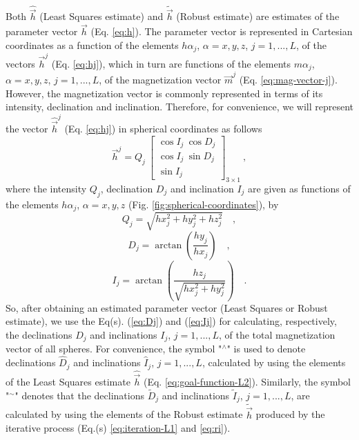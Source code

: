 \documentclass[journal abbreviation, npg]{copernicus}
\begin{document}
Both $\hat{\vec{h}}$ (Least Squares estimate) and $\tilde{\vec{h}}$ (Robust estimate) are estimates of the parameter vector $\vec{h}$ (Eq. \ref{eq:h}). The parameter vector is represented in Cartesian coordinates as a function of the elements $h\alpha_{j}$, $\alpha = x, y, z$, $j = 1, ..., L$, of the vectors $\vec{h}^{j}$ (Eq. \ref{eq:hj}), which in turn are functions of the elements $m\alpha_{j}$, $\alpha = x, y, z$, $j = 1, ..., L$, of the magnetization vector $\vec{m}^{j}$ (Eq. \ref{eq:mag-vector-j}). However, the magnetization vector is commonly represented in terms of its intensity, declination and inclination. Therefore, for convenience, we will represent the vector $\hat{\vec{h}}^{j}$ (Eq. \ref{eq:hj}) in spherical coordinates as follows
\begin{equation}
\vec{h}^{j} = Q_{j} \:
\left[
\begin{array}{c}
\cos I_{j} \: \cos D_{j} \\
\cos I_{j} \: \sin D_{j} \\
\sin I_{j}
\end{array}
\right]_{3 \times 1} \: ,
\label{eq:hj-spheric}
\end{equation}
where the intensity $Q_{j}$, declination $D_{j}$ and inclination $I_{j}$ are given as functions of the elements $h\alpha_{j}$, $\alpha = x, y, z$ (Fig. \ref{fig:spherical-coordinates}), by
\begin{equation}
Q_{j} = \sqrt{hx_{j}^{2} + hy_{j}^{2} + hz_{j}^{2}} \quad ,
\label{eq:Qj}
\end{equation}
\begin{equation}
D_{j} = \arctan \left( \dfrac{hy_{j}}{hx_{j}} \right) \quad ,
\label{eq:Dj}
\end{equation}
\begin{equation}
I_{j} = \arctan \left( \dfrac{hz_{j}}{\sqrt{hx_{j}^{2} + hy_{j}^{2}}} \right) \quad .
\label{eq:Ij}
\end{equation}
So, after obtaining an estimated parameter vector (Least Squares or Robust estimate), we use the Eq(s). (\ref{eq:Dj}) and (\ref{eq:Ij}) for calculating, respectively, the declinations $D_{j}$ and inclinations $I_{j}$, $j = 1, ..., L$, of the total magnetization vector of all spheres. For convenience, the symbol "$^\wedge$" is used to denote declinations $\hat{D}_{j}$ and inclinations $\hat{I}_{j}$, $j = 1, ..., L$, calculated by using the elements of the Least Squares estimate $\hat{\vec{h}}$ (Eq. \ref{eq:goal-function-L2}). Similarly, the symbol "$^\sim$" denotes that the declinations $\tilde{D}_{j}$ and inclinations $\tilde{I}_{j}$, $j = 1, ..., L$, are calculated by using the elements of the Robust estimate $\tilde{\vec{h}}$ produced by the iterative process (Eq.(s) \ref{eq:iteration-L1} and \ref{eq:ri}).
\end{document}
